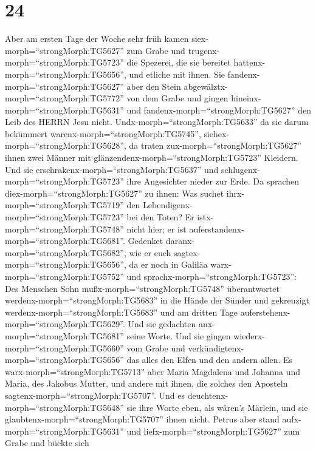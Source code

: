 \hypertarget{section-23}{%
\section{24}\label{section-23}}

 Aber am ersten Tage der Woche sehr früh kamen
siex-morph=``strongMorph:TG5627'' zum Grabe und
trugenx-morph=``strongMorph:TG5723'' die Spezerei, die sie bereitet
hattenx-morph=``strongMorph:TG5656'', und etliche mit ihnen.
 Sie fandenx-morph=``strongMorph:TG5627'' aber den Stein
abgewälztx-morph=``strongMorph:TG5772'' von dem Grabe  und
gingen hineinx-morph=``strongMorph:TG5631'' und
fandenx-morph=``strongMorph:TG5627'' den Leib des HERRN Jesu nicht.
 Undx-morph=``strongMorph:TG5633'' da sie darum bekümmert
warenx-morph=``strongMorph:TG5745'',
siehex-morph=``strongMorph:TG5628'', da traten
zux-morph=``strongMorph:TG5627'' ihnen zwei Männer mit
glänzendenx-morph=``strongMorph:TG5723'' Kleidern.  Und sie
erschrakenx-morph=``strongMorph:TG5637'' und
schlugenx-morph=``strongMorph:TG5723'' ihre Angesichter nieder zur Erde.
Da sprachen diex-morph=``strongMorph:TG5627'' zu ihnen: Was suchet
ihrx-morph=``strongMorph:TG5719'' den
Lebendigenx-morph=``strongMorph:TG5723'' bei den Toten?  Er
istx-morph=``strongMorph:TG5748'' nicht hier; er ist
auferstandenx-morph=``strongMorph:TG5681''. Gedenket
daranx-morph=``strongMorph:TG5682'', wie er euch
sagtex-morph=``strongMorph:TG5656'', da er noch in Galiläa
warx-morph=``strongMorph:TG5752''  und
sprachx-morph=``strongMorph:TG5723'': Des Menschen Sohn
mußx-morph=``strongMorph:TG5748'' überantwortet
werdenx-morph=``strongMorph:TG5683'' in die Hände der Sünder und
gekreuzigt werdenx-morph=``strongMorph:TG5683'' und am dritten Tage
auferstehenx-morph=``strongMorph:TG5629''.  Und sie
gedachten anx-morph=``strongMorph:TG5681'' seine Worte.  Und
sie gingen wiederx-morph=``strongMorph:TG5660'' vom Grabe und
verkündigtenx-morph=``strongMorph:TG5656'' das alles den Elfen und den
andern allen.  Es warx-morph=``strongMorph:TG5713'' aber
Maria Magdalena und Johanna und Maria, des Jakobus Mutter, und andere
mit ihnen, die solches den Aposteln
sagtenx-morph=``strongMorph:TG5707''.  Und es
deuchtenx-morph=``strongMorph:TG5648'' sie ihre Worte eben, als wären's
Märlein, und sie glaubtenx-morph=``strongMorph:TG5707'' ihnen nicht.
 Petrus aber stand aufx-morph=``strongMorph:TG5631'' und
liefx-morph=``strongMorph:TG5627'' zum Grabe und bückte sich
